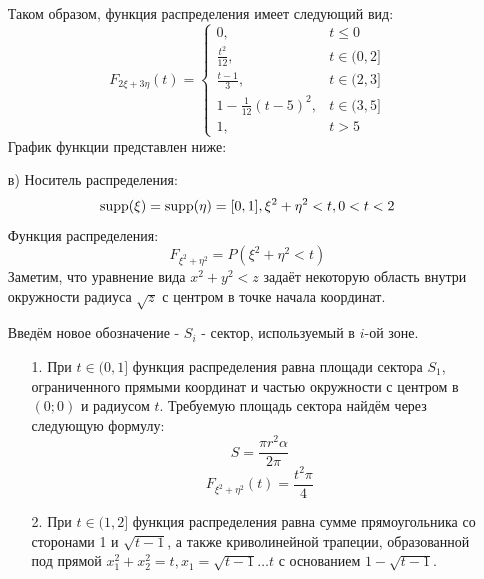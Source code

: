 \begin{exmp}
\begin{enumerate}
\begin{figure}[H]
		\end{figure}
		Таком образом, функция распределения имеет следующий вид:
		\[
		F_{2\xi + 3\eta} (t) =
		\begin{cases}
			0, &t \le 0 \\
			\frac{t^2}{12}, &t \in (0, 2] \\
			\frac{t-1}{3}, &t \in (2, 3] \\
			1 - \frac{1}{12}(t-5)^2, &t \in (3, 5] \\
			1, &t > 5
		\end{cases}
		\]
		График функции представлен ниже:
		\begin{figure}[H]
		\end{figure}
		
		\item[в)]
		Носитель распределения:
		\[ \operatorname{supp} (\xi) = \operatorname{supp} (\eta) = [0, 1], \xi^2 + \eta^2 < t, 0 < t < 2 \]
		Функция распределения:
		\[ F_{\xi^2 + \eta^2} = P(\xi^2 + \eta^2 < t) \]
		Заметим, что уравнение вида $x^2 + y^2 < z$ задаёт некоторую область внутри окружности радиуса $\sqrt{z}$ с центром в точке начала координат.
		
		Введём новое обозначение - $S_i$ - сектор, используемый в $i$-ой зоне.
		
		\begin{enumerate}
			\item[1.] При $t \in (0, 1]$ функция распределения равна площади сектора $S_1$, ограниченного прямыми координат и частью окружности с центром в $(0;0)$ и радиусом $t$. Требуемую площадь сектора найдём через следующую формулу:
			\[ S = \frac{\pi r^2 \alpha}{2 \pi} \]
			\[ F_{\xi^2 + \eta^2} (t) = \frac{t^2 \pi}{4} \]
			\item[2.] При $t \in (1, 2]$ функция распределения равна сумме прямоугольника со сторонами 1 и $\sqrt{t-1}$, а также криволинейной трапеции, образованной под прямой $x_1^2 + x_2^2 = t, x_1 = \sqrt{t-1} \dots t$ с основанием $1 - \sqrt{t-1}$.
			

\end{enumerate}
\end{enumerate}
\end{exmp}
